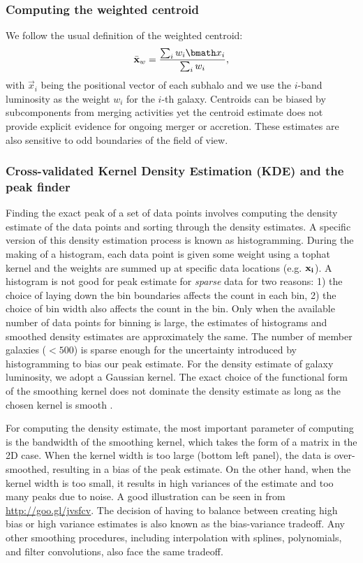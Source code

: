 \subsubsection{Computing the weighted centroid}
\label{subsubsec:weighted_centroid}
We follow the usual definition of the weighted centroid: 
\begin{equation}
	\bar{\bf x}_w = \frac{\sum_i w_i \vec{x}_i}{\sum_i w_i},
\end{equation}
with $\vec{x}_i$ being the positional vector of each subhalo 
and we use the $i$-band luminosity 
as the weight $w_i$ for the $i$-th galaxy.
Centroids can be biased by subcomponents from merging activities yet the
centroid estimate does not provide explicit evidence for ongoing merger or 
accretion. These estimates are also sensitive to odd boundaries 
of the field of view.

\subsubsection{Cross-validated Kernel Density Estimation (KDE) and the peak finder} 
\label{subsubsec:KDE}
Finding the exact peak of a set of data points 
involves computing the density estimate of the data points and sorting through
the density estimates. A specific version of this density estimation process is
known as histogramming. During the making of a histogram, each data point is
given some weight using a tophat kernel and the weights are summed up at
specific data locations (e.g. $\bf{x}_i$). 
A histogram is not good for peak estimate for {\it sparse} data for two reasons: 1) the
choice of laying down the bin boundaries affects the count in each bin, 2) the choice of
bin width also affects the count in the bin. Only when the available number of data points
for binning is large, the estimates of histograms and smoothed density
estimates are approximately the same. The number of member galaxies ($< 500$) 
is sparse enough for the uncertainty introduced by histogramming to bias our
peak estimate. For the density estimate of galaxy luminosity, 
we adopt a Gaussian kernel. 
The exact choice of the functional form of the smoothing kernel does
not dominate the density estimate as long as the chosen kernel is
smooth \citep{Feigelson2014}. 

For computing the density estimate, the most important parameter of computing 
is the bandwidth of the smoothing kernel, 
which takes the form of a matrix in the 2D case. 
When the kernel width is
too large (bottom left panel), the data is over-smoothed, 
resulting in a bias of the peak estimate. On the other hand, when the kernel
width is too small, it results in high variances of the estimate and 
too many peaks due to noise. 
A good illustration can be seen in \citealt{Vanderplas2012} from 
\href{http://www.astroml.org/book\_figures/chapter6/fig\_hist\_to\_kernel.html}{http://goo.gl/jvsfcv}.
The decision of having to balance between creating high
bias or high variance estimates is also known as the bias-variance tradeoff. 
Any other smoothing procedures, including interpolation with splines,
polynomials, and filter convolutions, also face the same tradeoff. 

